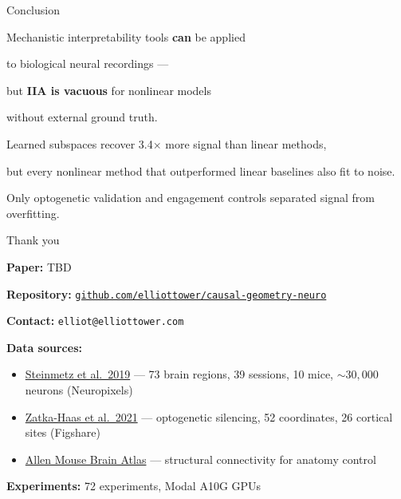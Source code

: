 \documentclass[aspectratio=169,11pt]{beamer}
\begin{document}
\begin{frame}{Conclusion}

\begin{center}
\vspace{0.5em}
{\Large Mechanistic interpretability tools \textbf{can} be applied}

\vspace{0.2em}

{\Large to biological neural recordings ---}

\vspace{0.6em}

{\Large but \textbf{IIA is vacuous} for nonlinear models}

\vspace{0.2em}

{\Large without external ground truth.}

\vspace{1.2em}

{\small Learned subspaces recover 3.4$\times$ more signal than linear methods,}

\vspace{0.2em}

{\small but every nonlinear method that outperformed linear baselines also fit to noise.}

\vspace{0.1em}

{\small Only optogenetic validation and engagement controls separated signal from overfitting.}
\end{center}
\end{frame}

\begin{frame}{Thank you}

\textbf{Paper:} TBD

\vspace{0.3em}
\textbf{Repository:} \href{https://github.com/elliottower/causal-geometry-neuro}{\texttt{github.com/elliottower/causal-geometry-neuro}}

\vspace{0.3em}
\textbf{Contact:} \texttt{elliot@elliottower.com}

\vspace{0.3em}
{\small
\textbf{Data sources:}
\begin{itemize}\setlength\itemsep{0pt}
  \item \href{https://doi.org/10.1038/s41586-019-1787-x}{Steinmetz et al.\ 2019} --- 73 brain regions, 39 sessions, 10 mice, ${\sim}30{,}000$ neurons (Neuropixels)
  \item \href{https://doi.org/10.7554/eLife.63163}{Zatka-Haas et al.\ 2021} --- optogenetic silencing, 52 coordinates, 26 cortical sites (Figshare)
  \item \href{https://connectivity.brain-map.org/}{Allen Mouse Brain Atlas} --- structural connectivity for anatomy control
\end{itemize}

\textbf{Experiments:} 72 experiments, Modal A10G GPUs
}
\end{frame}
\end{document}
